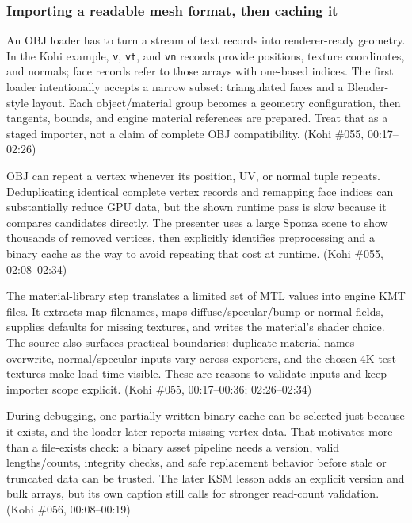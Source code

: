 \subsubsection{Importing a readable mesh format, then caching it}\label{06-engine-ii-ch027-importing-a-readable-mesh-format-then-caching-it}

\hypertarget{06-engine-ii-ch027-importing-a-readable-mesh-format-then-caching-it}{}

An OBJ loader has to turn a stream of text records into renderer-ready geometry. In the Kohi example, \texttt{v}, \texttt{vt}, and \texttt{vn} records provide positions, texture coordinates, and normals; face records refer to those arrays with one-based indices. The first loader intentionally accepts a narrow subset: triangulated faces and a Blender-style layout. Each object/material group becomes a geometry configuration, then tangents, bounds, and engine material references are prepared. Treat that as a staged importer, not a claim of complete OBJ compatibility. (Kohi \#055, 00:17--02:26)

OBJ can repeat a vertex whenever its position, UV, or normal tuple repeats. Deduplicating identical complete vertex records and remapping face indices can substantially reduce GPU data, but the shown runtime pass is slow because it compares candidates directly. The presenter uses a large Sponza scene to show thousands of removed vertices, then explicitly identifies preprocessing and a binary cache as the way to avoid repeating that cost at runtime. (Kohi \#055, 02:08--02:34)

The material-library step translates a limited set of MTL values into engine KMT files. It extracts map filenames, maps diffuse/specular/bump-or-normal fields, supplies defaults for missing textures, and writes the material's shader choice. The source also surfaces practical boundaries: duplicate material names overwrite, normal/specular inputs vary across exporters, and the chosen 4K test textures make load time visible. These are reasons to validate inputs and keep importer scope explicit. (Kohi \#055, 00:17--00:36; 02:26--02:34)

During debugging, one partially written binary cache can be selected just because it exists, and the loader later reports missing vertex data. That motivates more than a file-exists check: a binary asset pipeline needs a version, valid lengths/counts, integrity checks, and safe replacement behavior before stale or truncated data can be trusted. The later KSM lesson adds an explicit version and bulk arrays, but its own caption still calls for stronger read-count validation. (Kohi \#056, 00:08--00:19)

